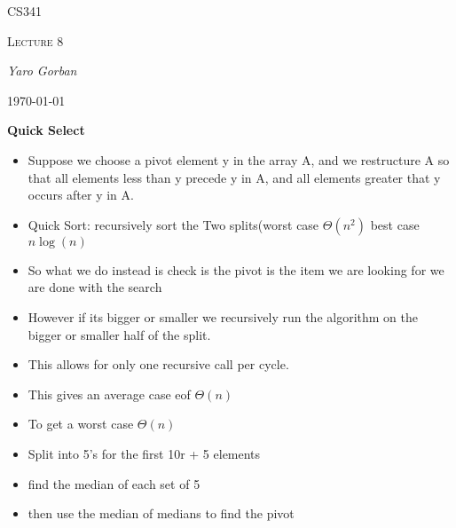 \documentclass[12pt,a4paper]{report}
\begin{document}
	\centering
	{\scshape\LARGE CS341 \par}
	{\scshape\Large Lecture 8\par}
	{\Large\itshape Yaro Gorban\par}
	{\large \today\par}
	\vspace{1.5cm}

\textbf{Quick Select}
\begin{itemize}
\item Suppose we choose a pivot element y in the array A, and we restructure A so that all elements less than y precede y in A, and all elements greater that y occurs after y in A.
\item Quick Sort: recursively sort the Two splits(worst case $\Theta(n^2)$ best case $n\log (n)$
\item So what we do instead is check is the pivot is the item we are looking for we are done with the search
\item However if its bigger or smaller we recursively run the algorithm on the bigger or smaller half of the split.
\item This allows for only one recursive call per cycle.
\item This gives an average case eof $\Theta(n)$
\item To get a worst case $\Theta(n)$
\item Split into 5's for the first 10r + 5 elements
\item find the median of each set of 5
\item then use the median of medians to find the pivot
 
\end{itemize}
\end{document}
